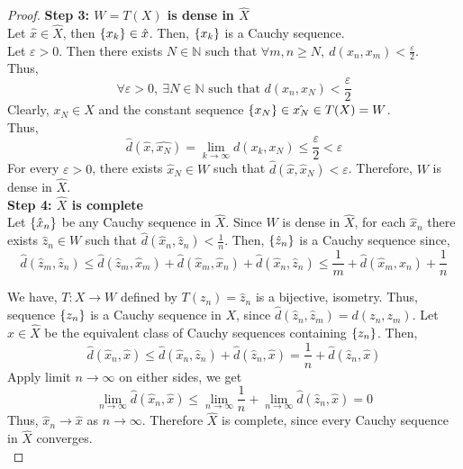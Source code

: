 \begin{proof}
	\textbf{Step 3: $W = T(X)$ is dense in $\hat{X}$}\\
	Let $\hat{x} \in \hat{X}$, then $\left\{x_k\right\} \in \hat{x}$.
	Then, $\left\{x_k\right\}$ is a Cauchy sequence.\\
	Let $\varepsilon > 0$.
	Then there exists $N \in \mathbb{N}$ such that $\forall m,n \ge N,\ d(x_n,x_m) < \frac{\varepsilon}{2}$.\\
	Thus,
	\[ \forall \varepsilon > 0,\ \exists N \in \mathbb{N} \text{ such that } d(x_n,x_N) < \frac{\varepsilon}{2} \]
	Clearly, $x_N \in X$ and the constant sequence $\left\{x_N\right\} \in \hat{x_N} \in T(X) = W$.\\
	Thus,
	\[ \hat{d}(\hat{x},\hat{x_N}) = \lim_{k \to \infty} d(x_k,x_N) \le \frac{\varepsilon}{2} < \varepsilon \]
	For every $\varepsilon > 0$, there exists $\hat{x}_N \in W$ such that $\hat{d}(\hat{x},\hat{x}_N) < \varepsilon$.
	Therefore, $W$ is dense in $\hat{X}$.\\

	\textbf{Step 4: $\hat{X}$ is complete}\\
	Let $\left\{\hat{x}_n\right\}$ be any Cauchy sequence in $\hat{X}$.
	Since $W$ is dense in $\hat{X}$, for each $\hat{x}_n$ there exists $\hat{z}_n \in W$ such that $\hat{d}(\hat{x}_n,\hat{z}_n) < \frac{1}{n}$.
	Then, $\left\{\hat{z}_n\right\}$ is a Cauchy sequence since,
	\[ \hat{d}(\hat{z}_m,\hat{z}_n) \le \hat{d}(\hat{z}_m,\hat{x}_m) + \hat{d}(\hat{x}_m,\hat{x}_n)+\hat{d}(\hat{x}_n,\hat{z}_n) \le \frac{1}{m} + \hat{d}(\hat{x}_m,\hat{x}_n) + \frac{1}{n} \]

	We have, $T : X \to W$ defined by $T(z_n) = \hat{z}_n$ is a bijective, isometry.
	Thus, sequence $\left\{z_n\right\}$ is a Cauchy sequence in $X$, since $\hat{d}(\hat{z}_n,\hat{z}_m) = d(z_n,z_m)$.
	Let $\hat{x} \in \hat{X}$ be the equivalent class of Cauchy sequences containing $\left\{z_n\right\}$.
	Then,
	\[ \hat{d}(\hat{x}_n,\hat{x}) \le \hat{d}(\hat{x}_n,\hat{z}_n) + \hat{d}(\hat{z}_n,\hat{x}) = \frac{1}{n} + \hat{d}(\hat{z}_n,\hat{x}) \]
	Apply limit $n \to \infty$ on either sides, we get
	\[ \lim_{n \to \infty} \hat{d}(\hat{x}_n,\hat{x}) \le \lim_{n \to \infty} \frac{1}{n} + \lim_{n \to \infty} \hat{d}(\hat{z}_n,\hat{x}) = 0 \]
	Thus, $\hat{x}_n \to \hat{x}$ as $n \to \infty$.
	Therefore $\hat{X}$ is complete, since every Cauchy sequence in $\hat{X}$ converges.\\


\end{proof}
